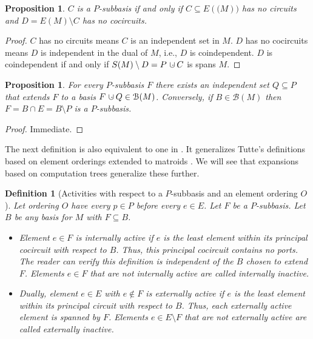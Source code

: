 \documentclass[12pt,leqno]{amsart}
\newtheorem{prop}[lem]{Proposition}
\newtheorem{definition}[lem]{Definition}
\theoremstyle{remark}
\newcommand{\dunion}
{\mbox{\hbox{\hskip6pt$\cdot$\hskip-5.50pt$\cup$\hskip2pt}}}
\begin{document}
\begin{prop}
$C$ is a $P$-subbasis if and only if
$C \subseteq E(\mathcal(M))$ has no circuits and 
$D=E(M)\setminus C$ has no cocircuits.
\end{prop}

\begin{proof}
$C$ has no circuits means $C$ is an independent set in 
$M$.
$D$ has no cocircuits means $D$ is independent in
the dual of $M$, i.e., $D$ is coindependent.  
$D$ is coindependent if and only if
$S(M)\setminus D=P\dunion C$ is spans
$M$.
\end{proof}


\begin{prop}
For every $P$-subbasis $F$ there exists an independent set $Q\subseteq P$
that extends $F$ to a basis $F\dunion Q\in \mathcal{B}(M)$.
Conversely, if $B\in\mathcal{B}(M)$ then $F=B\cap E=B\setminus P$
is a $P$-subbasis.
\end{prop}

\begin{proof} Immediate. \end{proof}


The next definition 
is also equivalent to one in \cite{RelTuttePoly}. It generalizes
Tutte's definitions based on element orderings \cite{TutteGraphBook,TutteDich} 
extended to
matroids \cite{CrapoAct}.  We will see that expansions based on 
computation trees generalize these further.

\begin{definition}[Activities with respect to a $P$-subbasis and an element
ordering $O$]
\label{Activities-Ordered-Def}
Let ordering $O$ have every $p\in P$ before every
$e\in E$.  Let $F$ be a $P$-subbasis.  Let $B$ be any basis for 
$M$ with $F\subseteq B$.
\begin{itemize}
\item Element $e\in F$
is internally active if $e$ is the least element
within its principal cocircuit with respect to $B$.  Thus, this principal
cocircuit contains no ports.  The reader can verify this definition is 
independent of the $B$ chosen to extend $F$.  Elements $e\in F$ that are
not internally active are called internally inactive.
\item Dually, element $e\in E$ with $e\not\in F$ is externally 
active if $e$ is the least element within its principal circuit with
respect to $B$.  Thus, each externally active element is spanned by 
$F$.  Elements $e\in E\setminus F$ that are not externally active
are called externally inactive.
\end{itemize}
\end{definition}
\end{document}
